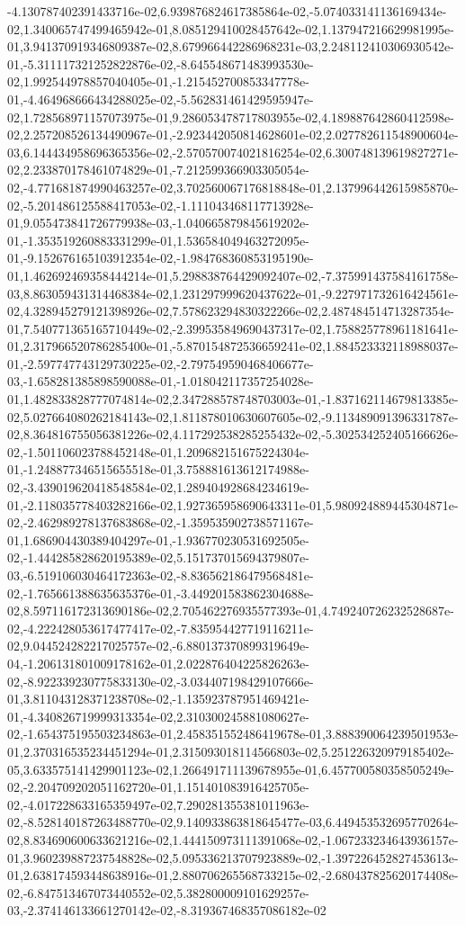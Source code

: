 -4.130787402391433716e-02,6.939876824617385864e-02,-5.074033141136169434e-02,1.340065747499465942e-01,8.085129410028457642e-02,1.137947216629981995e-01,3.941370919346809387e-02,8.679966442286968231e-03,2.248112410306930542e-01,-5.311117321252822876e-02,-8.645548671483993530e-02,1.992544978857040405e-01,-1.215452700853347778e-01,-4.464968666434288025e-02,-5.562831461429595947e-02,1.728568971157073975e-01,9.286053478717803955e-02,4.189887642860412598e-02,2.257208526134490967e-01,-2.923442050814628601e-02,2.027782611548900604e-03,6.144434958696365356e-02,-2.570570074021816254e-02,6.300748139619827271e-02,2.233870178461074829e-01,-7.212599366903305054e-02,-4.771681874990463257e-02,3.702560067176818848e-01,2.137996442615985870e-02,-5.201486125588417053e-02,-1.111043468117713928e-01,9.055473841726779938e-03,-1.040665879845619202e-01,-1.353519260883331299e-01,1.536584049463272095e-01,-9.152676165103912354e-02,-1.984768360853195190e-01,1.462692469358444214e-01,5.298838764429092407e-02,-7.375991437584161758e-03,8.863059431314468384e-02,1.231297999620437622e-01,-9.227971732616424561e-02,4.328945279121398926e-02,7.578623294830322266e-02,2.487484514713287354e-01,7.540771365165710449e-02,-2.399535849690437317e-02,1.758825778961181641e-01,2.317966520786285400e-01,-5.870154872536659241e-02,1.884523332118988037e-01,-2.597747743129730225e-02,-2.797549590468406677e-03,-1.658281385898590088e-01,-1.018042117357254028e-01,1.482833828777074814e-02,2.347288578748703003e-01,-1.837162114679813385e-02,5.027664080262184143e-02,1.811878010630607605e-02,-9.113489091396331787e-02,8.364816755056381226e-02,4.117292538285255432e-02,-5.302534252405166626e-02,-1.501106023788452148e-01,1.209682151675224304e-01,-1.248877346515655518e-01,3.758881613612174988e-02,-3.439019620418548584e-02,1.289404928684234619e-01,-2.118035778403282166e-02,1.927365958690643311e-01,5.980924889445304871e-02,-2.462989278137683868e-02,-1.359535902738571167e-01,1.686904430389404297e-01,-1.936770230531692505e-02,-1.444285828620195389e-02,5.151737015694379807e-03,-6.519106030464172363e-02,-8.836562186479568481e-02,-1.765661388635635376e-01,-3.449201583862304688e-02,8.597116172313690186e-02,2.705462276935577393e-01,4.749240726232528687e-02,-4.222428053617477417e-02,-7.835954427719116211e-02,9.044524282217025757e-02,-6.880137370899319649e-04,-1.206131801009178162e-01,2.022876404225826263e-02,-8.922339230775833130e-02,-3.034407198429107666e-01,3.811043128371238708e-02,-1.135923787951469421e-01,-4.340826719999313354e-02,2.310300245881080627e-02,-1.654375195503234863e-01,2.458351552486419678e-01,3.888390064239501953e-01,2.370316535234451294e-01,2.315093018114566803e-02,5.251226320979185402e-05,3.633575141429901123e-02,1.266491711139678955e-01,6.457700580358505249e-02,-2.204709202051162720e-01,1.151401083916425705e-02,-4.017228633165359497e-02,7.290281355381011963e-02,-8.528140187263488770e-02,9.140933863818645477e-03,6.449453532695770264e-02,8.834690600633621216e-02,1.444150973111391068e-02,-1.067233234643936157e-01,3.960239887237548828e-02,5.095336213707923889e-02,-1.397226452827453613e-01,2.638174593448638916e-01,2.880706265568733215e-02,-2.680437825620174408e-02,-6.847513467073440552e-02,5.382800009101629257e-03,-2.374146133661270142e-02,-8.319367468357086182e-02
